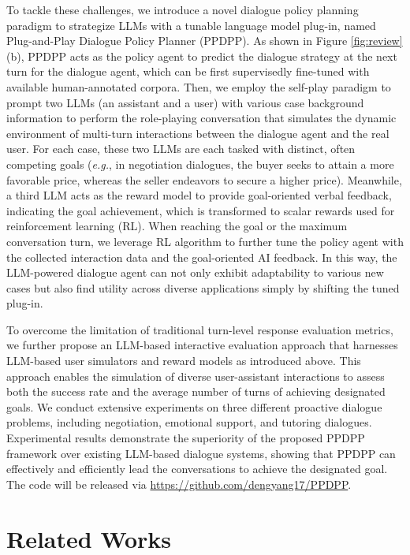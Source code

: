\documentclass{article} %
\begin{document}
To tackle these challenges, we introduce a novel dialogue policy planning paradigm to strategize LLMs with a tunable language model plug-in, named Plug-and-Play Dialogue Policy Planner (PPDPP). 
As shown in Figure \ref{fig:review}(b), PPDPP acts as the policy agent to predict the dialogue strategy at the next turn for the dialogue agent, which can be first supervisedly fine-tuned with available human-annotated corpora. 
Then, we employ the self-play paradigm to prompt two LLMs (an assistant and a user) with various case background information to perform the role-playing conversation that simulates the dynamic environment of multi-turn interactions between the dialogue agent and the real user. 
For each case, these two LLMs are each tasked with distinct, often competing goals (\textit{e.g.}, in negotiation dialogues, the buyer seeks to attain a more favorable price, whereas the seller endeavors to secure a higher price). 
Meanwhile, a third LLM acts as the reward model to provide goal-oriented verbal feedback, indicating the goal achievement, which is transformed to scalar rewards used for reinforcement learning (RL). 
When reaching the goal or the maximum conversation turn, we leverage RL algorithm to further tune the policy agent with the collected interaction data and the goal-oriented AI feedback.
In this way, the LLM-powered dialogue agent can not only exhibit adaptability to various new cases but also find utility across diverse applications simply by shifting the tuned plug-in.


To overcome the limitation of traditional turn-level response evaluation metrics, we further propose an LLM-based interactive evaluation approach that harnesses LLM-based user simulators and reward models as introduced above. This approach enables the simulation of diverse user-assistant interactions to assess both the success rate and the average number of turns of achieving designated goals. 
We conduct extensive experiments on three different proactive dialogue problems, including negotiation, emotional support, and tutoring dialogues. 
Experimental results demonstrate the superiority of the proposed PPDPP framework over existing LLM-based dialogue systems, showing that PPDPP can effectively and efficiently lead the conversations to achieve the designated goal. The code will be released via \url{https://github.com/dengyang17/PPDPP}.




\section{Related Works}
\end{document}
